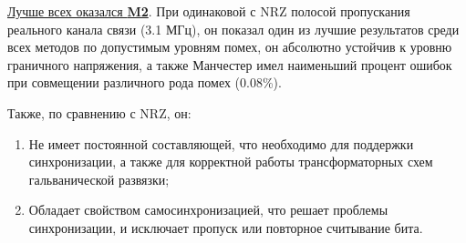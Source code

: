 \underline{Лучше всех оказался \textbf{M2}}. При одинаковой с NRZ полосой пропускания реального канала связи (3.1 МГц), он показал один из лучшие результатов среди всех методов по допустимым уровням помех, он абсолютно устойчив к уровню граничного напряжения, а также Манчестер имел наименьший процент ошибок при совмещении различного рода помех (0.08\%).

Также, по сравнению с NRZ, он:
\begin{enumerate}
	\item Не имеет постоянной составляющей, что необходимо для поддержки синхронизации, а также для корректной работы трансформаторных схем гальванической развязки;
	\item Обладает свойством самосинхронизацией, что решает проблемы синхронизации, и исключает пропуск или повторное считывание бита.
\end{enumerate}
